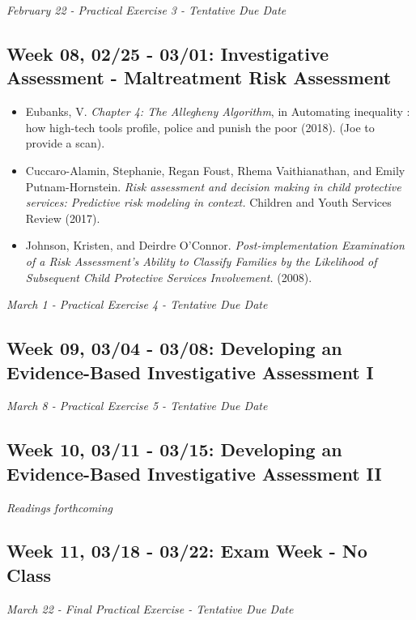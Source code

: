 \documentclass[11pt,]{article}
\begin{document}
\emph{February 22 - Practical Exercise 3 - Tentative Due Date}

\subsection{Week 08, 02/25 - 03/01: Investigative Assessment -
Maltreatment Risk
Assessment}\label{week-08-0225---0301-investigative-assessment---maltreatment-risk-assessment}

\begin{itemize}
\item
  Eubanks, V. \emph{Chapter 4: The Allegheny Algorithm}, in Automating
  inequality : how high-tech tools profile, police and punish the poor
  (2018). (Joe to provide a scan).
\item
  Cuccaro-Alamin, Stephanie, Regan Foust, Rhema Vaithianathan, and Emily
  Putnam-Hornstein. \emph{Risk assessment and decision making in child
  protective services: Predictive risk modeling in context.} Children
  and Youth Services Review (2017).
\item
  Johnson, Kristen, and Deirdre O'Connor. \emph{Post-implementation
  Examination of a Risk Assessment's Ability to Classify Families by the
  Likelihood of Subsequent Child Protective Services Involvement.}
  (2008).
\end{itemize}

\emph{March 1 - Practical Exercise 4 - Tentative Due Date}

\subsection{Week 09, 03/04 - 03/08: Developing an Evidence-Based
Investigative Assessment
I}\label{week-09-0304---0308-developing-an-evidence-based-investigative-assessment-i}

\emph{March 8 - Practical Exercise 5 - Tentative Due Date}

\subsection{Week 10, 03/11 - 03/15: Developing an Evidence-Based
Investigative Assessment
II}\label{week-10-0311---0315-developing-an-evidence-based-investigative-assessment-ii}

\emph{Readings forthcoming}

\subsection{Week 11, 03/18 - 03/22: Exam Week - No
Class}\label{week-11-0318---0322-exam-week---no-class}

\emph{March 22 - Final Practical Exercise - Tentative Due Date}
\end{document}
